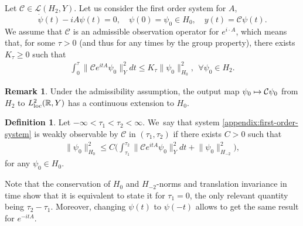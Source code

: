 \documentclass[JEP,XML,SOM,Unicode,published]{cedram}
\newcommand\mto{\mathchoice{\longmapsto}{\mapsto}{\mapsto}{\mapsto}}
\theoremstyle{definition}
\newtheorem{definition}[theorem]{Definition}
\newtheorem{remark}[theorem]{Remark}
\let\mc\mathcal
\newcommand{\R}{\mathbb{R}}
\providecommand{\norm}[1]{\lVert#1\rVert}
\begin{document}
Let $\mc{C}\in \mc{L}(H_2, Y)$. Let us consider the first order system for $A$,
\begin{equation}
\label{appendix:first-order-system}
\dot{\psi}(t)-iA\psi(t)=0,\quad \psi(0)=\psi_0\in H_0,\quad y(t)=\mc{C}\psi(t).
\end{equation}
We assume that $\mc{C}$ is an admissible observation operator for $e^{i\cdot A}$, which means that, for some $\tau>0$ (and thus for any times by the group property), there exists $K_\tau\geq 0$ such that
\begin{align*}
\int_0^\tau \norm{\mc{C}e^{itA}\psi_0}_Y^2dt\leq K_\tau \norm{\psi_0}_{H_0}^2,\ \ \forall \psi_0\in H_2.
\end{align*}
\begin{remark}
Under the admissibility assumption, the output map $\psi_0\mto \mc{C}\psi_0$ from $H_2$ to $L_{\textup{loc}}^2(\R, Y)$ has a continuous extension to $H_0$.
\end{remark}
\begin{definition}
Let $-\infty< \tau_1<\tau_2<\infty$. We~say that system \eqref{appendix:first-order-system} is weakly observable by $\mc{C}$ in $(\tau_1, \tau_2)$ if there exists $C>0$ such that
\begin{align*}
\norm{\psi_0}_{H_0}^2\leq C\biggl(\int_{\tau_1}^{\tau_2} \norm{\mc{C}e^{itA}\psi_0}_{Y}^2dt+\norm{\psi_0}_{H_{-2}}^2\biggr),
\end{align*}
for any $\psi_0\in H_0$.
\end{definition}

Note that the conservation of $H_0$ and $H_{-2}$-norms and translation invariance in time show that it is equivalent to state it for $\tau_1=0$, the only relevant quantity being $\tau_2-\tau_1$. Moreover, changing $\psi(t)$ to $\psi(-t)$ allows to get the same result for $e^{-itA}$.
\end{document}

